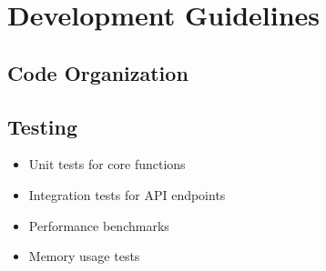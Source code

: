 \section{Development Guidelines}
\subsection{Code Organization}

\subsection{Testing}
\begin{itemize}
    \item Unit tests for core functions
    \item Integration tests for API endpoints
    \item Performance benchmarks
    \item Memory usage tests
\end{itemize}
